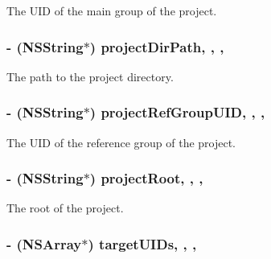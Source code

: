 The U\-I\-D of the main group of the project. \hypertarget{interface_f_f_x_c_project_a49a09d8648a92fc54406764334483413}{
\subsubsection[{project\-Dir\-Path}]{\setlength{\rightskip}{0pt plus 5cm}-\/ (N\-S\-String$\ast$) project\-Dir\-Path\hspace{0.3cm}{\ttfamily [read]}, {\ttfamily [write]}, {\ttfamily [nonatomic]}, {\ttfamily [strong]}}}\label{interface_f_f_x_c_project_a49a09d8648a92fc54406764334483413}
The path to the project directory. \hypertarget{interface_f_f_x_c_project_a5926b13b772c262c8305679b69fbb619}{
\subsubsection[{project\-Ref\-Group\-U\-I\-D}]{\setlength{\rightskip}{0pt plus 5cm}-\/ (N\-S\-String$\ast$) project\-Ref\-Group\-U\-I\-D\hspace{0.3cm}{\ttfamily [read]}, {\ttfamily [write]}, {\ttfamily [nonatomic]}, {\ttfamily [strong]}}}\label{interface_f_f_x_c_project_a5926b13b772c262c8305679b69fbb619}
The U\-I\-D of the reference group of the project. \hypertarget{interface_f_f_x_c_project_a8984593eb6669c3d57fa2921fd1b916e}{
\subsubsection[{project\-Root}]{\setlength{\rightskip}{0pt plus 5cm}-\/ (N\-S\-String$\ast$) project\-Root\hspace{0.3cm}{\ttfamily [read]}, {\ttfamily [write]}, {\ttfamily [nonatomic]}, {\ttfamily [strong]}}}\label{interface_f_f_x_c_project_a8984593eb6669c3d57fa2921fd1b916e}
The root of the project. \hypertarget{interface_f_f_x_c_project_a8d63eb24f67b51e1537f448f8c6b4974}{
\subsubsection[{target\-U\-I\-Ds}]{\setlength{\rightskip}{0pt plus 5cm}-\/ (N\-S\-Array$\ast$) target\-U\-I\-Ds\hspace{0.3cm}{\ttfamily [read]}, {\ttfamily [write]}, {\ttfamily [nonatomic]}, {\ttfamily [strong]}}}\label{interface_f_f_x_c_project_a8d63eb24f67b51e1537f448f8c6b4974}
